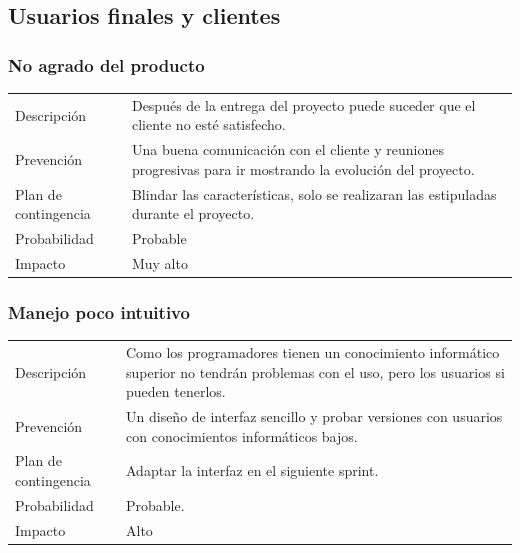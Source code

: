 \subsection{Usuarios finales y clientes}
\subsubsection{No agrado del producto}
\begin{table}[H]
    \begin{center}
        \begin{tabular}{l p{8cm}}
            Descripci\'{o}n                 & Despu\'{e}s de la entrega del proyecto puede suceder que el cliente no est\'{e} satisfecho. \\
            Prevenci\'{o}n                  & Una buena comunicación con el cliente y reuniones progresivas para ir mostrando la evolución del proyecto. \\ 
            Plan de contingencia            & Blindar las caracter\'{i}sticas, solo se realizaran las estipuladas durante el proyecto. \\
            Probabilidad                    & Probable \\
            Impacto                         & Muy alto \\
        \end{tabular}
    \end{center}
    
\end{table}

\subsubsection{Manejo poco intuitivo}
\begin{table}[H]
    \begin{center}
        \begin{tabular}{l p{8cm}}
            Descripci\'{o}n                 & Como  los  programadores  tienen  un  conocimiento
            inform\'{a}tico superior no tendr\'{a}n problemas con el uso, pero los usuarios si pueden tenerlos.\\
            Prevenci\'{o}n                  & Un diseño de interfaz sencillo y probar versiones con
            usuarios con conocimientos inform\'{a}ticos bajos. \\ 
            Plan de contingencia            & Adaptar la interfaz en el siguiente sprint. \\
            Probabilidad                    & Probable. \\
            Impacto                         & Alto \\
        \end{tabular}
    \end{center}
    
\end{table}

